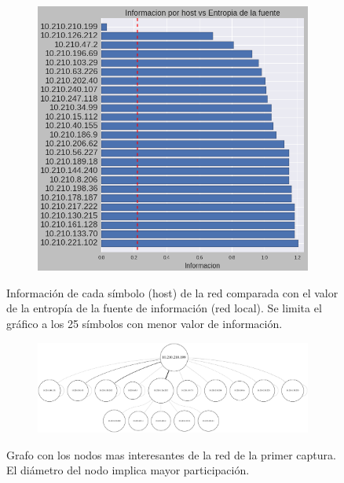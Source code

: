 \begin{figure}[h]
  \begin{subfigure}{.5\textwidth}
    \includegraphics[width=\textwidth]{imagenes/laboratorio/informaciones_vs_entropia.png}
  \end{subfigure}
  \label{fig:exp1_labo_infovsentro}
  \caption{Información de cada símbolo (host) de la red comparada con el valor de la entropía de la fuente de información (red local). Se limita el gráfico a los 25 símbolos con menor valor de información.}
\end{figure}

\begin{figure}[ht]
  \hspace*{-0.5cm}
  \begin{subfigure}{1.1\textwidth}
    \includegraphics[width=\textwidth]{imagenes/laboratorio/grafo_10.png}
  \end{subfigure}
	\label{fig:exp1_labo_grafo}
	\caption{Grafo con los nodos mas interesantes de la red de la primer captura. El diámetro del nodo implica mayor participación.}
\end{figure}

